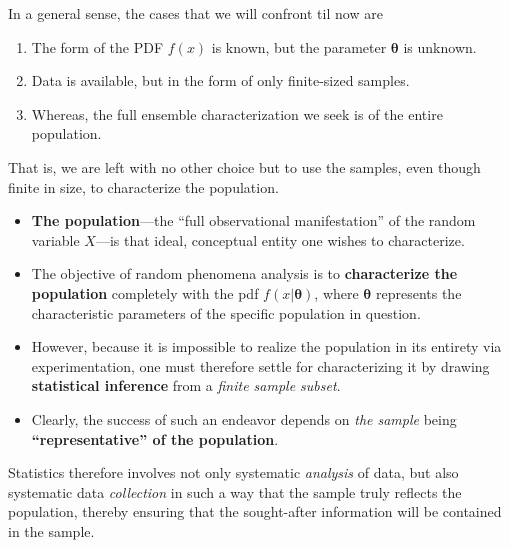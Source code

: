 \documentclass[twoside]{article}
\theoremstyle{definition}
\theoremstyle{remark}
\theoremstyle{remark}
\begin{document}
In a general sense, the cases that we will confront til now are
\begin{enumerate}
  \item The form of the PDF $f(x)$ is known, but the parameter $\boldsymbol{\theta}$ is
  unknown.
  \item Data is available, but in the form of only finite-sized samples.
  \item Whereas, the full ensemble characterization we seek is of the entire
  population.
\end{enumerate}
That is, we are left with no other choice but to use the samples, even though
finite in size, to characterize the population.
\begin{itemize}
  \item \textbf{The population}---the ``full observational manifestation''
  of the random variable $X$---is that ideal, conceptual entity one wishes
  to characterize.
  \item The objective of random phenomena analysis is to \textbf{characterize
  the population} completely with the pdf $f(x|\boldsymbol{\theta})$, where
  $\boldsymbol{\theta}$ represents the characteristic parameters of the
  specific population in question.
  \item However, because it is impossible to realize the population in its
  entirety via experimentation, one must therefore settle for characterizing
  it by drawing \textbf{statistical inference} from a \textit{finite sample
  subset}.
  \item Clearly, the success of such an endeavor depends on \textit{the sample}
  being \textbf{``representative'' of the population}.
\end{itemize}
Statistics therefore involves not only systematic \textit{analysis} of data,
but also systematic data \textit{collection} in such a way that the sample
truly reflects the population, thereby ensuring that the sought-after
information will be contained in the sample.








\printbibliography

\end{document}
